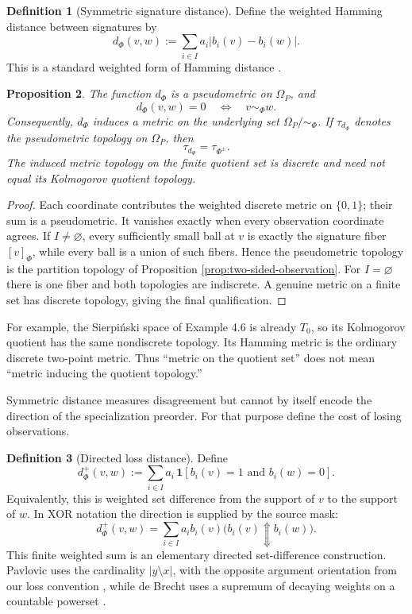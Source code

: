 \documentclass[11pt]{article}
\theoremstyle{definition}
\newtheorem{definition}{Definition}[section]
\theoremstyle{plain}
\newtheorem{proposition}[definition]{Proposition}
\theoremstyle{remark}
\newcommand{\ind}{\mathbf 1}
\begin{document}
\begin{definition}[Symmetric signature distance]
Define the weighted Hamming distance between signatures by
\[
 d_\Phi(v,w)
 :=\sum_{i\in I} a_i\lvert b_i(v)-b_i(w)\rvert.
\]
This is a standard weighted form of Hamming distance \cite{Hamming1950}.
\end{definition}

\begin{proposition}
The function $d_\Phi$ is a pseudometric on $\Omega_P$, and
\[
 d_\Phi(v,w)=0
 \quad\Longleftrightarrow\quad
 v\sim_\Phi w.
\]
Consequently, $d_\Phi$ induces a metric on the underlying set
$\Omega_P/{\sim_\Phi}$.  If $\tau_{d_\Phi}$ denotes the pseudometric topology on
$\Omega_P$, then
\[
 \tau_{d_\Phi}=\tau_{\Phi^{\pm}}.
\]
The induced metric topology on the finite quotient set is discrete and need not
equal its Kolmogorov quotient topology.
\end{proposition}

\begin{proof}
Each coordinate contributes the weighted discrete metric on $\{0,1\}$; their
sum is a pseudometric.  It vanishes exactly when every observation coordinate
agrees.  If $I\neq\varnothing$, every sufficiently small ball at $v$ is exactly the signature
fiber $[v]_\Phi$, while every ball is a union of such fibers.  Hence the
pseudometric topology is the partition topology of Proposition
\ref{prop:two-sided-observation}.  For $I=\varnothing$ there is one fiber and both
topologies are indiscrete.  A genuine metric on a finite set has discrete
topology, giving the final qualification.
\end{proof}

For example, the Sierpi\'nski space of Example 4.6 is already $T_0$, so its
Kolmogorov quotient has the same nondiscrete topology.  Its Hamming metric is
the ordinary discrete two-point metric.  Thus ``metric on the quotient set''
does not mean ``metric inducing the quotient topology.''

Symmetric distance measures disagreement but cannot by itself encode the
direction of the specialization preorder.  For that purpose define the cost of
losing observations.

\begin{definition}[Directed loss distance]
Define
\[
 d_\Phi^+(v,w)
 :=\sum_{i\in I} a_i\,
   \ind[b_i(v)=1\text{ and }b_i(w)=0].
\]
Equivalently, this is weighted set difference from the support of $v$ to the
support of $w$.  In XOR notation the direction is supplied by the source mask:
\[
 d_\Phi^+(v,w)=\sum_{i\in I} a_i b_i(v)
   \bigl(b_i(v)\Updownarrow b_i(w)\bigr).
\]
This finite weighted sum is an elementary directed set-difference construction.
Pavlovic uses the cardinality $\lvert y\setminus x\rvert$, with the opposite
argument orientation from our loss convention \cite[Sec.~2]{Pavlovic2012},
while de Brecht uses a supremum of decaying weights on a countable powerset
\cite[Sec.~4]{deBrecht2013}.
\end{definition}
\end{document}

